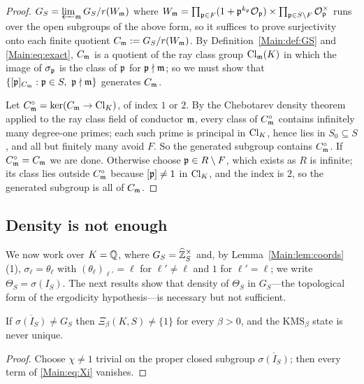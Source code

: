 \begin{proof}
$G_S=\varprojlim_{\mathfrak{m}} G_S/r(W_{\mathfrak{m}})$ where
$W_{\mathfrak{m}}=\prod_{\mathfrak{p}\in F}(1+\mathfrak{p}^{k_{\mathfrak{p}}}\mathcal{O}_{\mathfrak{p}})\times\prod_{\mathfrak{p}\in S\setminus F}\mathcal{O}_{\mathfrak{p}}^\times$
runs over the open subgroups of the above form, so it suffices to prove
surjectivity onto each finite quotient $C_{\mathfrak{m}}:=G_S/r(W_{\mathfrak{m}})$. By
Definition~\ref{Main:def:GS} and \eqref{Main:eq:exact}, $C_{\mathfrak{m}}$ is a quotient of the ray
class group $\operatorname{Cl}_{\mathfrak{m}}(K)$ in which the image of $\sigma_{\mathfrak{p}}$ is the class of
$\mathfrak{p}$ for $\mathfrak{p}\nmid\mathfrak{m}$; so we must show that
$\{[\mathfrak{p}]_{C_{\mathfrak{m}}}:\mathfrak{p}\in S,\ \mathfrak{p}\nmid\mathfrak{m}\}$ generates $C_{\mathfrak{m}}$.

Let $C^\circ_{\mathfrak{m}}=\ker(C_{\mathfrak{m}}\to\operatorname{Cl}_K)$, of index $1$ or $2$. By the Chebotarev
density theorem applied to the ray class field of conductor $\mathfrak{m}$, every class
of $C^\circ_{\mathfrak{m}}$ contains infinitely many degree-one primes; each such prime is
principal in $\operatorname{Cl}_K$, hence lies in $S_0\subseteq S$, and all but finitely many
avoid $F$. So the generated subgroup contains $C^\circ_{\mathfrak{m}}$. If
$C^\circ_{\mathfrak{m}}=C_{\mathfrak{m}}$ we are done. Otherwise choose $\mathfrak{p}\in R\setminus F$, which
exists as $R$ is infinite; its class lies outside $C^\circ_{\mathfrak{m}}$ because
$[\mathfrak{p}]\neq1$ in $\operatorname{Cl}_K$, and the index is $2$, so the generated subgroup is all
of $C_{\mathfrak{m}}$.
\end{proof}

\subsection{Density is not enough}\label{Main:sec:density}

We now work over $K=\mathbb{Q}$, where $G_S=\widehat{\mathbb{Z}}_S^\times$ and, by Lemma~\ref{Main:lem:coords}(1),
$\sigma_\ell=\theta_\ell$ with $(\theta_\ell)_{\ell'}=\ell$ for
$\ell'\neq\ell$ and $1$ for $\ell'=\ell$; we write $\Theta_S=\sigma(I_S)$. The
next results show that density of $\Theta_S$ in $G_S$---the topological form of
the ergodicity hypothesis---is necessary but not sufficient.

\begin{lemma}\label{Main:lem:densenec}
If $\overline{\sigma(I_S)}\neq G_S$ then $\Xi_\beta(K,S)\neq\{1\}$ for every
$\beta>0$, and the $\mathrm{KMS}_\beta$ state is never unique.
\end{lemma}

\begin{proof}
Choose $\chi\neq1$ trivial on the proper closed subgroup
$\overline{\sigma(I_S)}$; then every term of \eqref{Main:eq:Xi} vanishes.
\end{proof}

